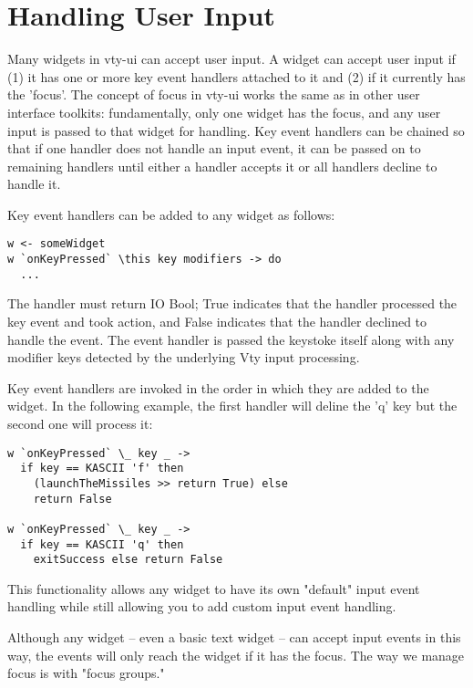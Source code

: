 \section{Handling User Input}

Many widgets in vty-ui can accept user input.  A widget can accept user
input if (1) it has one or more key event handlers attached to it and
(2) if it currently has the 'focus'.  The concept of focus in vty-ui
works the same as in other user interface toolkits:  fundamentally, only
one widget has the focus, and any user input is passed to that widget
for handling.  Key event handlers can be chained so that if one handler
does not handle an input event, it can be passed on to remaining
handlers until either a handler accepts it or all handlers decline to
handle it.

Key event handlers can be added to any widget as follows:

\begin{verbatim}
w <- someWidget
w `onKeyPressed` \this key modifiers -> do
  ...
\end{verbatim}

The handler must return IO Bool; True indicates that the handler
processed the key event and took action, and False indicates that the
handler declined to handle the event.  The event handler is passed the
keystoke itself along with any modifier keys detected by the underlying
Vty input processing.

Key event handlers are invoked in the order in which they are added to
the widget.  In the following example, the first handler will deline the
'q' key but the second one will process it:

\begin{verbatim}
w `onKeyPressed` \_ key _ ->
  if key == KASCII 'f' then
    (launchTheMissiles >> return True) else
    return False

w `onKeyPressed` \_ key _ ->
  if key == KASCII 'q' then
    exitSuccess else return False
\end{verbatim}

This functionality allows any widget to have its own "default" input
event handling while still allowing you to add custom input event
handling.

Although any widget -- even a basic text widget -- can accept input
events in this way, the events will only reach the widget if it has the
focus.  The way we manage focus is with "focus groups."

